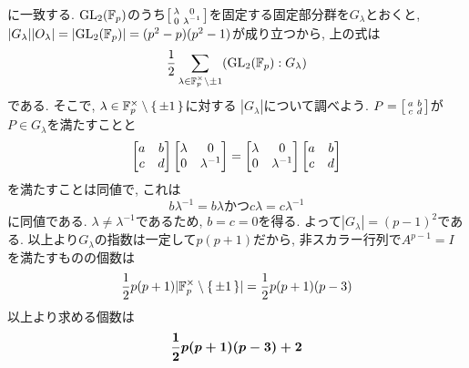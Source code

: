 に一致する. $\mathrm{GL}_{2}(\mathbb{F}_{p})$のうち$\left[\begin{smallmatrix}\lambda & 0 \\ 0 & \lambda^{-1}\end{smallmatrix}\right]$を固定する固定部分群を$G_{\lambda}$とおくと, $|G_{\lambda}||O_{\lambda}| = |\mathrm{GL}_{2}(\mathbb{F}_{p})| = (p^2-p)(p^2-1)$が成り立つから,
上の式は
\[\dfrac{1}{2}\sum_{\lambda\in \mathbb{F}_{p}^{\times}\setminus{\pm 1} } (\mathrm{GL}_{2}(\mathbb{F}_{p}): G_{\lambda}) \]
である. そこで, $\lambda\in \mathbb{F}_{p}^{\times}\setminus{\set{\pm 1}}$に対する $|G_{\lambda}|$について調べよう. $P = \left[\begin{smallmatrix}a&b\\ c&d\end{smallmatrix}\right]$が$P\in G_{\lambda}$を満たすことと
\[\begin{bmatrix}a&b\\ c&d\end{bmatrix}\begin{bmatrix}\lambda & 0 \\ 0 & \lambda^{-1}\end{bmatrix} = \begin{bmatrix}\lambda & 0 \\ 0 & \lambda^{-1}\end{bmatrix}\begin{bmatrix}a&b\\c&d\end{bmatrix} \]
を満たすことは同値で, これは
\[b\lambda^{-1} = b\lambda かつ c\lambda = c\lambda^{-1} \]
に同値である. $\lambda\neq \lambda^{-1}$であるため, $b=c=0$を得る. よって$|G_{\lambda}| = (p-1)^2$である. 以上より$G_{\lambda}$の指数は一定して$p(p+1)$だから, 非スカラー行列で$A^{p-1}=I$を満たすものの個数は
\[\dfrac{1}{2}p(p+1)|\mathbb{F}_{p}^{\times}\setminus{\set{\pm 1}}| = \dfrac{1}{2}p(p+1)(p-3)\]
以上より求める個数は
\[{\mbox{\boldmath $\dfrac{1}{2}p(p+1)(p-3) + 2$}}\]

